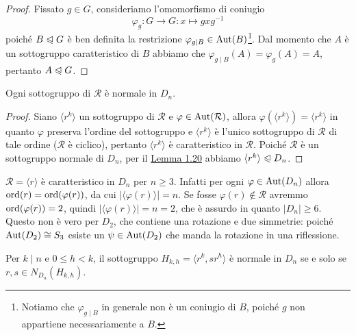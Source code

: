 \documentclass[11pt]{scrartcl}
\begin{document}
\begin{proof}
    Fissato $g \in G$, consideriamo l'omomorfismo di coniugio 
    \[
        \varphi_g : G\longrightarrow G : x\longmapsto gxg^{-1}
    \] poiché 
    $B\trianglelefteqslant G$ è ben definita la restrizione $\varphi_{g\mid B} \in \operatorname{Aut}(B)$\footnote{
        Notiamo che $\varphi_{g\mid B}$ in generale non è un 
        coniugio di $B$, poiché $g$ non appartiene necessariamente a $B$.
    }. 
    Dal momento che $A$ è
    un sottogruppo caratteristico di $B$ abbiamo che $\varphi_{g\mid B}(A) =
    \varphi_g(A) = A$,
    pertanto $A \trianglelefteqslant G$.
\end{proof}


\begin{corollary}
    Ogni sottogruppo di $\mathcal{R}$ è normale in $D_n$.
\end{corollary}

\begin{proof}
    Siano $\langle r^k\rangle$ un sottogruppo di $\mathcal{R}$ e $\varphi
    \in \operatorname{Aut}(\mathcal{R})$, allora $\varphi(\langle r^k\rangle) = \langle r^k\rangle$
    in quanto $\varphi$ preserva l'ordine del sottogruppo e $\langle r^k\rangle$
    è l'unico sottogruppo di $\mathcal{R}$ di tale ordine ($\mathcal{R}$ è ciclico),
    pertanto $\langle r^k\rangle$
    è caratteristico in $\mathcal{R}$. Poiché $\mathcal{R}$ è un sottogruppo
    normale di $D_n$, per il \hyperref[lemma1.20]{Lemma 1.20}
    abbiamo $\langle r^k\rangle\trianglelefteqslant D_n$.
\end{proof}

\begin{remark}
    $\mathcal{R} = \langle r \rangle$ è caratteristico in $D_n$ per $n \geqslant 3$.
    Infatti per ogni $\varphi \in \operatorname{Aut}(D_n)$ allora
    $\operatorname{ord}(r) = \operatorname{ord}(\varphi(r))$, da cui $|\langle\varphi(r)\rangle| = n$.
    Se fosse $\varphi(r) \notin \mathcal{R}$ avremmo $\operatorname{ord}(\varphi(r)) = 2$, 
    quindi $|\langle \varphi(r)\rangle| = n = 2$, che è assurdo in quanto $|D_n| \geqslant 6$.
    Questo non è vero per $D_2$, che contiene una rotazione e due
    simmetrie: poiché $\operatorname{Aut}(D_2) \cong S_3$ esiste un $\psi \in \operatorname{Aut}(D_2)$ che manda 
    la rotazione in una riflessione.
\end{remark}

\begin{corollary}
    Per $k\mid n$ e $0\leq h < k$, il sottogruppo $H_{k, h} = \langle r^k, sr^h\rangle$
    è normale in $D_n$ se e solo se $r, s \in N_{D_n}(H_{k, h})$.
\end{corollary}
\end{document}

